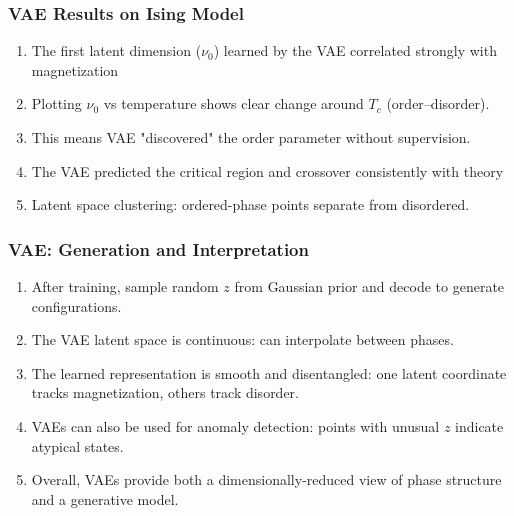 \documentclass{beamer}
\begin{document}
\begin{frame}
\frametitle{VAE Results on Ising Model}

\begin{enumerate}
\item The first latent dimension ($\nu_0$) learned by the VAE correlated strongly with magnetization 

\item Plotting $\nu_0$ vs temperature shows clear change around $T_c$ (order–disorder).

\item This means VAE "discovered" the order parameter without supervision.

\item The VAE predicted the critical region and crossover consistently with theory 

\item Latent space clustering: ordered-phase points separate from disordered.
\end{enumerate}

\noindent
\end{frame}

\begin{frame}
\frametitle{VAE: Generation and Interpretation}

\begin{enumerate}
\item After training, sample random $z$ from Gaussian prior and decode to generate configurations.

\item The VAE latent space is continuous: can interpolate between phases.

\item The learned representation is smooth and disentangled: one latent coordinate tracks magnetization, others track disorder.

\item VAEs can also be used for anomaly detection: points with unusual $z$ indicate atypical states.

\item Overall, VAEs provide both a dimensionally-reduced view of phase structure and a generative model.
\end{enumerate}

\noindent
\end{frame}
\end{document}
